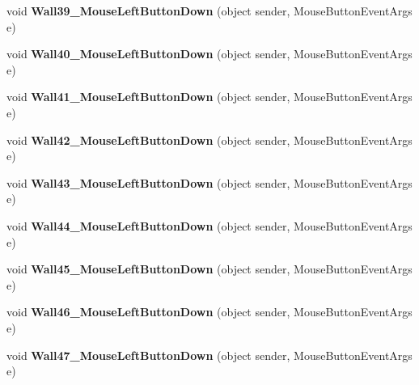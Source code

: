 \begin{DoxyCompactItemize}
void {\bfseries Wall39\+\_\+\+Mouse\+Left\+Button\+Down} (object sender, Mouse\+Button\+Event\+Args e)
\item 
\mbox{\label{class_r6_1_1_border_window_ac79854859480360cc4808b656b512f88}} 
void {\bfseries Wall40\+\_\+\+Mouse\+Left\+Button\+Down} (object sender, Mouse\+Button\+Event\+Args e)
\item 
\mbox{\label{class_r6_1_1_border_window_a3337fdca13ce321c7604407ea7266689}} 
void {\bfseries Wall41\+\_\+\+Mouse\+Left\+Button\+Down} (object sender, Mouse\+Button\+Event\+Args e)
\item 
\mbox{\label{class_r6_1_1_border_window_a5fcf682883371d32fea51dfeb9698c07}} 
void {\bfseries Wall42\+\_\+\+Mouse\+Left\+Button\+Down} (object sender, Mouse\+Button\+Event\+Args e)
\item 
\mbox{\label{class_r6_1_1_border_window_acfe1ea7d90c46e988b5c667e2660ec3b}} 
void {\bfseries Wall43\+\_\+\+Mouse\+Left\+Button\+Down} (object sender, Mouse\+Button\+Event\+Args e)
\item 
\mbox{\label{class_r6_1_1_border_window_a068a45a6c5f20e3a6b2b6ac0294d0ed0}} 
void {\bfseries Wall44\+\_\+\+Mouse\+Left\+Button\+Down} (object sender, Mouse\+Button\+Event\+Args e)
\item 
\mbox{\label{class_r6_1_1_border_window_a1ed122c4c9e3d3e4a220ae79c04ec640}} 
void {\bfseries Wall45\+\_\+\+Mouse\+Left\+Button\+Down} (object sender, Mouse\+Button\+Event\+Args e)
\item 
\mbox{\label{class_r6_1_1_border_window_a97239097b90285ac25e6d8ea65e32f92}} 
void {\bfseries Wall46\+\_\+\+Mouse\+Left\+Button\+Down} (object sender, Mouse\+Button\+Event\+Args e)
\item 
\mbox{\label{class_r6_1_1_border_window_a95dc491696fd24263587ce3449399588}} 
void {\bfseries Wall47\+\_\+\+Mouse\+Left\+Button\+Down} (object sender, Mouse\+Button\+Event\+Args e)
\item 
\mbox{\label{class_r6_1_1_border_window_ab17b9624862ccb5c55b4dc0bafe157aa}} 

\end{DoxyCompactItemize}
